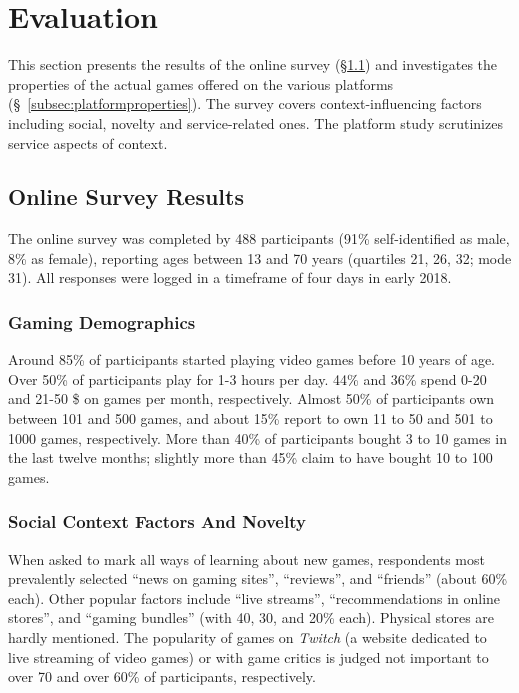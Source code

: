 \section{Evaluation}
\label{sec:eval}

This section presents the results of the online survey
(§\ref{subsec:survey}) and
investigates the properties of the actual games offered on the
various platforms (§~\ref{subsec:platformproperties}).
The survey covers context-influencing factors including social,
novelty and service-related ones. The platform study scrutinizes
service aspects of context.

\subsection{Online Survey Results}\label{subsec:survey}
The online survey was completed by 488 participants
(91\% self-identified as male, 8\% as female), reporting
ages between 13 and 70 years (quartiles 21, 26, 32; mode 31).
All responses were logged in a timeframe of four days in early 2018.

\subsubsection{Gaming Demographics}
Around 85\% of
participants started playing video games before 10 years of age.
Over 50\% of participants play for 1-3 hours per day.
44\% and 36\% spend 0-20 and 21-50 \$ on games per month, respectively.
Almost 50\% of participants own between 101 and 500 games, and about
15\% report to own 11 to 50 and 501 to 1000 games, respectively.
More than 40\% of participants bought 3 to 10 games in the last
twelve months; slightly more than 45\% claim to have bought
10 to 100 games.



\subsubsection{Social Context Factors And Novelty}

When asked to mark all ways of learning about new games, respondents
most prevalently selected ``news on gaming sites'', ``reviews'', and
``friends'' (about 60\% each). Other popular factors include
``live streams'', ``recommendations in online stores'', and
``gaming bundles'' (with 40, 30, and 20\% each). Physical stores
are hardly mentioned.
The popularity of games on \textit{Twitch} (a website dedicated to
live streaming of video games) or with game critics is judged not
important to over 70 and over 60\% of participants, respectively.

